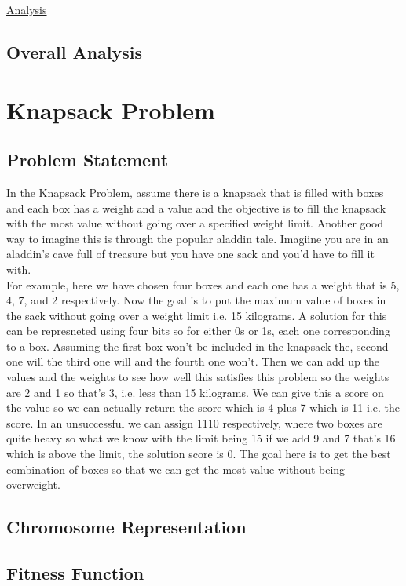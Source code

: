 \documentclass[11pt, letterpaper]{article}
\begin{document}
\underline{Analysis}

\subsection {Overall Analysis}

\newpage

\section{Knapsack Problem}
\subsection{Problem Statement}
In the Knapsack Problem, assume there is a knapsack that is filled with boxes and each box has a 
weight and a value and the objective is to fill the knapsack with the most value without going over 
a specified weight limit. Another good way to imagine this is through the popular aladdin tale. 
Imagiine you are in an aladdin's cave full of treasure but you have one sack and you'd have to fill 
it with.\\
For example, here we have chosen four boxes and each one has a weight that is 5, 4, 7, and 2 
respectively. Now the goal is to put the maximum value of boxes in the sack without going over a 
weight limit i.e. 15 kilograms. A solution for this can be represneted using four bits so for either 0s 
or 1s, each one corresponding to a box. Assuming the first box
won't be included in the knapsack 
the, second one will the third one will and the fourth one won't. Then we can add up the values 
and the weights to see how well this satisfies this problem so the weights are 2 and 1 so that's 3, i.e. 
less than 15 kilograms. We can give this a score on the
value so we can actually return the score 
which is 4 plus 7 which is 11 i.e. the score. In an unsuccessful we can assign 1110 respectively, 
where two boxes are quite heavy so what we know with the limit being 15 if we add 9 and 7 that's 
16 which is above the limit, the solution score is 0. The goal here is to get the best combination of 
boxes so that we can get the most value without being overweight.

\subsection{Chromosome Representation}

\subsection{Fitness Function}
\end{document}
